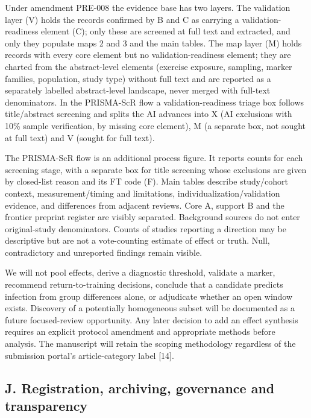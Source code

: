 \documentclass[
  11pt,
  a4paper,
]{article}
\begin{document}
Under amendment PRE-008 the evidence base has two layers. The validation
layer (V) holds the records confirmed by B and C as carrying a
validation-readiness element (C); only these are screened at full text
and extracted, and only they populate maps 2 and 3 and the main tables.
The map layer (M) holds records with every core element but no
validation-readiness element; they are charted from the abstract-level
elements (exercise exposure, sampling, marker families, population,
study type) without full text and are reported as a separately labelled
abstract-level landscape, never merged with full-text denominators. In
the PRISMA-ScR flow a validation-readiness triage box follows
title/abstract screening and splits the AI advances into X (AI
exclusions with 10\% sample verification, by missing core element), M (a
separate box, not sought at full text) and V (sought for full text).

The PRISMA-ScR flow is an additional process figure. It reports counts
for each screening stage, with a separate box for title screening whose
exclusions are given by closed-list reason and its FT code (F). Main
tables describe study/cohort context, measurement/timing and
limitations, individualization/validation evidence, and differences from
adjacent reviews. Core A, support B and the frontier preprint register
are visibly separated. Background sources do not enter original-study
denominators. Counts of studies reporting a direction may be descriptive
but are not a vote-counting estimate of effect or truth. Null,
contradictory and unreported findings remain visible.

We will not pool effects, derive a diagnostic threshold, validate a
marker, recommend return-to-training decisions, conclude that a
candidate predicts infection from group differences alone, or adjudicate
whether an open window exists. Discovery of a potentially homogeneous
subset will be documented as a future focused-review opportunity. Any
later decision to add an effect synthesis requires an explicit protocol
amendment and appropriate methods before analysis. The manuscript will
retain the scoping methodology regardless of the submission portal's
article-category label {[}14{]}.

\subsection{J. Registration, archiving, governance and
transparency}\label{j.-registration-archiving-governance-and-transparency}
\end{document}
